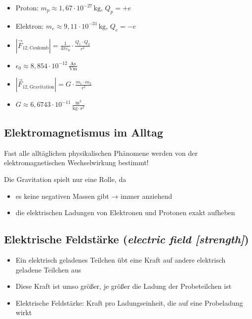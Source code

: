 \documentclass[
  11pt,
]{article}
\providecommand{\tightlist}{%
  \setlength{\itemsep}{0pt}\setlength{\parskip}{0pt}}
\begin{document}
\begin{itemize}
\tightlist
\item
  Proton: \(m_p \approx 1{,}67 \cdot 10^{-27} \, \text{kg}\),
  \(Q_p = +e\)
\item
  Elektron: \(m_e \approx 9{,}11 \cdot 10^{-31} \, \text{kg}\),
  \(Q_e = -e\)
\item
  \(|\vec{F}_{12,\text{Coulomb}}| = \frac{1}{4 \pi \varepsilon_0} \cdot \frac{Q_1 \cdot Q_2}{r^2}\)
\item
  \(\epsilon_0 \approx 8{,}854 \cdot 10^{-12} \, \frac{\text{As}}{\text{Vm}}\)
\item
  \(|\vec{F}_{12,\text{Gravitation}}| = G \cdot \frac{m_1 \cdot m_2}{r^2}\)
\item
  \(G \approx 6{,}6743 \cdot 10^{-11} \, \frac{\text{m}^3}{\text{kg} \cdot \text{s}^2}\)
\end{itemize}

\subsection{Elektromagnetismus im
Alltag}\label{elektromagnetismus-im-alltag}

Fast alle alltäglichen physikalischen Phänomene werden von der
elektromagnetischen Wechselwirkung bestimmt!

Die Gravitation spielt nur eine Rolle, da

\begin{itemize}
\tightlist
\item
  es keine negativen Massen gibt → immer anziehend
\item
  die elektrischen Ladungen von Elektronen und Protonen exakt aufheben
\end{itemize}

\subsection{\texorpdfstring{Elektrische Feldstärke (\emph{electric field
{[}strength{]}})}{Elektrische Feldstärke (electric field {[}strength{]})}}\label{elektrische-feldstuxe4rke-electric-field-strength}

\begin{itemize}
\tightlist
\item
  Ein elektrisch geladenes Teilchen übt eine Kraft auf andere elektrisch
  geladene Teilchen aus
\item
  Diese Kraft ist umso größer, je größer die Ladung der Probeteilchen
  ist
\item
  Elektrische Feldstärke: Kraft pro Ladungseinheit, die auf eine
  Probeladung wirkt
\end{itemize}
\end{document}
